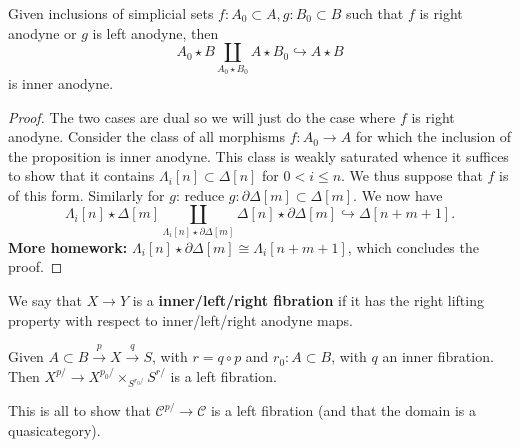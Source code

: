 \documentclass{amsart}
\begin{document}
\begin{lemma}
    Given inclusions of simplicial sets $f:A_0\subset A, g:B_0\subset B$ such that
    $f$ is right anodyne or $g$ is left anodyne, then
    \begin{equation*}
        A_0\star B \coprod_{A_0\star B_0} A\star B_0\hookrightarrow A\star B
    \end{equation*}
    is inner anodyne.
\end{lemma}
\begin{proof}
    The two cases are dual so we will just do the case where $f$ is right anodyne.
    Consider the class of all morphisms $f:A_0\to A$ for which the inclusion of the
    proposition is inner anodyne.
    This class is weakly saturated whence it suffices to show that it contains
    $\Lambda_i[n]\subset\Delta[n]$
    for $0 < i \leqslant n$. We thus suppose that $f$ is of this form.
    Similarly for $g$: reduce $g: \partial\Delta[m]\subset \Delta[m]$.
    We now have
    \begin{equation*}
        \Lambda_i[n]\star \Delta[m] \coprod_{\Lambda_i[n]\star\partial\Delta[m]}\Delta[n]\star \partial\Delta[m]\hookrightarrow \Delta[n+m+1].
    \end{equation*}
    \textbf{More homework:} $\Lambda_i[n]\star\partial\Delta[m]\cong \Lambda_i[n+m+1]$, which
    concludes the proof.
\end{proof}

\begin{definition}
    We say that $X\to Y$ is a \textbf{inner/left/right fibration} if it has the right
    lifting property with respect to inner/left/right anodyne maps.
\end{definition}

\begin{proposition}
    Given $A\subset B\xrightarrow{p} X\xrightarrow{q} S$, with $r=q\circ p$ and $r_0:A\subset B$,
    with $q$ an inner fibration. Then $X^{p/}\to X^{p_0/}\times_{S^{r_0/}}S^{r/}$ is a left fibration.
\end{proposition}

This is all to show that $\mathcal{C}^{p/}\to \mathcal{C}$ is a left fibration (and that the domain
is a quasicategory).
\end{document}
